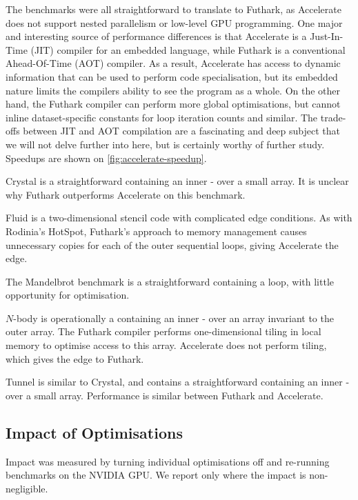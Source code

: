 The benchmarks were all straightforward to translate to Futhark, as
Accelerate does not support nested parallelism or low-level GPU
programming.  One major and interesting source of performance
differences is that Accelerate is a Just-In-Time (JIT) compiler for an
embedded language, while Futhark is a conventional Ahead-Of-Time (AOT)
compiler.  As a result, Accelerate has access to dynamic information
that can be used to perform code specialisation, but its embedded
nature limits the compilers ability to see the program as a whole.  On
the other hand, the Futhark compiler can perform more global
optimisations, but cannot inline dataset-specific constants for loop
iteration counts and similar.  The trade-offs between JIT and AOT
compilation are a fascinating and deep subject that we will not delve
further into here, but is certainly worthy of further study.  Speedups
are shown on \cref{fig:accelerate-speedup}.

Crystal is a straightforward  containing an inner
- over a small array.  It is unclear why
Futhark outperforms Accelerate on this benchmark.

Fluid is a two-dimensional stencil code with complicated edge
conditions.  As with Rodinia's HotSpot, Futhark's approach to memory
management causes unnecessary copies for each of the outer sequential
loops, giving Accelerate the edge.

The Mandelbrot benchmark is a straightforward  containing a
 loop, with little opportunity for optimisation.

$N$-body is operationally a  containing an inner
- over an array invariant to the outer array.  The
Futhark compiler performs one-dimensional tiling in local memory to
optimise access to this array.  Accelerate does not perform tiling,
which gives the edge to Futhark.

Tunnel is similar to Crystal, and contains a straightforward 
containing an inner - over a small array.
Performance is similar between Futhark and Accelerate.

\subsection{Impact of Optimisations}
\label{sec:impact-of-optimisation}

Impact was measured by turning individual optimisations off and
re-running benchmarks on the NVIDIA GPU.  We report only where
the impact is non-negligible.

